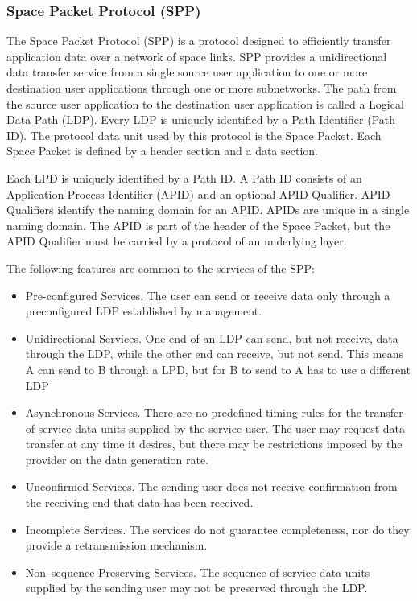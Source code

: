 \subsubsection*{Space Packet Protocol (SPP)\cite{SPP}}

The Space Packet Protocol (SPP) is a protocol designed to efficiently transfer application data over a network of space links. SPP provides a unidirectional data transfer service from a single source user application to one or more destination user applications through one or more subnetworks. The path from the source user application to the destination user application is called a Logical Data Path (LDP). Every LDP is uniquely identified by a Path Identifier (Path ID). The protocol data unit used by this protocol is the Space Packet. Each Space Packet is defined by a header section and a data section.

Each LPD is uniquely identified by a Path ID. A Path ID consists of an Application Process Identifier (APID) and an optional APID Qualifier. APID Qualifiers identify the naming domain for an APID. APIDs are unique in a single naming domain. The APID is part of the header of the Space Packet, but the APID Qualifier must be carried by a protocol of an underlying layer.

The following features are common to the services of the SPP:

\begin{itemize}
\item Pre-configured Services. The user can send or receive data only through a preconfigured LDP established by management.
\item Unidirectional Services. One end of an LDP can send, but not receive, data through the LDP, while the other end can receive, but not send. This means A can send to B through a LPD, but for B to send to A has to use a different LDP
\item Asynchronous Services. There are no predefined timing rules for the transfer of service data units supplied by the service user. The user may request data transfer at any time it desires, but there may be restrictions imposed by the provider on the data generation rate.
\item Unconfirmed Services. The sending user does not receive confirmation from the receiving end that data has been received.
\item Incomplete Services. The services do not guarantee completeness, nor do they provide a retransmission mechanism.
\item Non–sequence Preserving Services. The sequence of service data units supplied by the sending user may not be preserved through the LDP.
\end{itemize}

